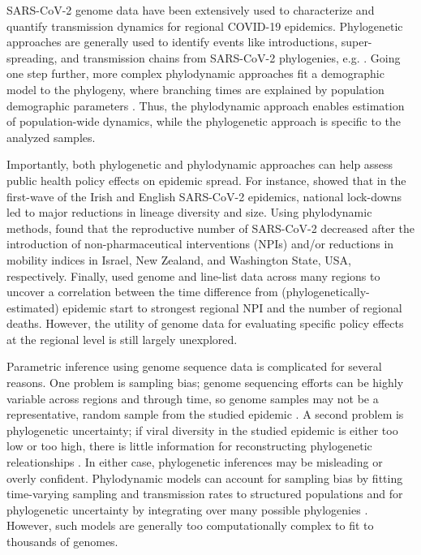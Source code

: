 \documentclass[9pt,twocolumn,twoside,lineno]{pnas-new}
\begin{document}
SARS-CoV-2 genome data have been extensively used to characterize and quantify transmission dynamics for regional COVID-19 epidemics. Phylogenetic approaches are generally used to identify events like introductions, super-spreading, and transmission chains from SARS-CoV-2 phylogenies, e.g. \cite{Lu2020, Eden2020, OudeMunnink2020, Bluhm2020}. Going one step further, more complex phylodynamic approaches fit a demographic model to the phylogeny, where branching times are explained by population demographic parameters \cite{Grenfell2004}. Thus, the phylodynamic approach enables estimation of population-wide dynamics, while the phylogenetic approach is specific to the analyzed samples.

Importantly, both phylogenetic and phylodynamic approaches can help assess public health policy effects on epidemic spread. For instance, \cite{Mallon2020, duPlessis2021} showed that in the first-wave of the Irish and English SARS-CoV-2 epidemics, national lock-downs led to major reductions in lineage diversity and size. Using phylodynamic methods, \cite{Miller2020, Geoghegan2020a, Muller2020a} found that the reproductive number of SARS-CoV-2 decreased after the introduction of non-pharmaceutical interventions (NPIs) and/or reductions in mobility indices in Israel, New Zealand, and Washington State, USA, respectively. Finally, \cite{Ragonnet-Cronin2021} used genome and line-list data across many regions to uncover a correlation between the time difference from  (phylogenetically-estimated) epidemic start to strongest regional NPI and the number of regional deaths. However, the utility of genome data for evaluating specific policy effects at the regional level is still largely unexplored.

Parametric inference using genome sequence data is complicated for several reasons. One problem is sampling bias; genome sequencing efforts can be highly variable across regions and through time, so genome samples may not be a representative, random sample from the studied epidemic  \cite{Villabona-Arenas2020, DeMaio2015}. A second problem is phylogenetic uncertainty; if viral diversity in the studied epidemic is either too low or too high, there is little information for reconstructing phylogenetic releationships  \cite{Villabona-Arenas2020}. In either case, phylogenetic inferences may be misleading or overly confident. Phylodynamic models can account for sampling bias by fitting  time-varying sampling and transmission rates to structured populations and for phylogenetic uncertainty by integrating over many possible phylogenies \cite{Scire2020b}. However, such models are generally too computationally complex to fit to thousands of genomes. 
\end{document}
